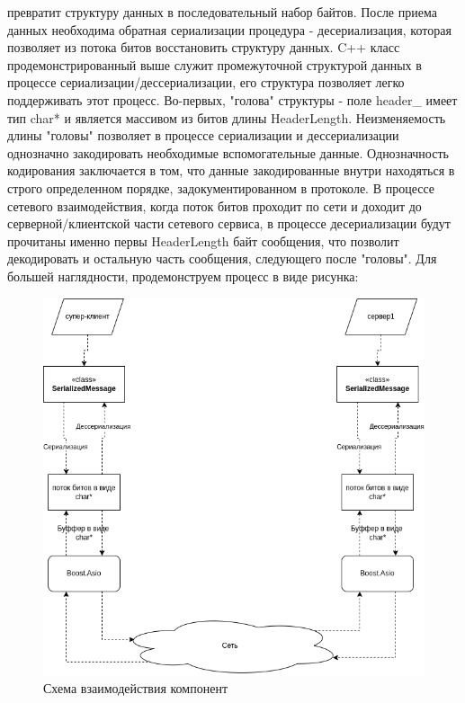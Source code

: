 \documentclass[a4paper, 14pt]{extreport}
\begin{document}
превратит структуру данных в последовательный набор байтов. После приема данных необходима обратная сериализации процедура - десериализация,
которая позволяет из потока битов восстановить структуру данных. C++ класс продемонстрированный выше служит промежуточной структурой данных 
в процессе сериализации/дессериализации, его структура позволяет легко поддерживать этот процесс. Во-первых, "голова" структуры - поле 
header\_ имеет тип char* и является массивом из битов длины HeaderLength. Неизменяемость длины "головы" позволяет в процессе сериализации 
и дессериализации однозначно закодировать необходимые вспомогательные данные. Однозначность кодирования заключается в том, что данные 
закодированные внутри находяться в строго определенном порядке, задокументированном в протоколе. В процессе сетевого взаимодействия,
когда поток битов проходит по сети и доходит до серверной/клиентской части сетевого сервиса, в процессе десериализации будут прочитаны 
именно первы HeaderLength байт сообщения, что позволит декодировать и остальную часть сообщения, следующего после "головы". Для большей
наглядности, продемонструем процесс в виде рисунка:
\newpage
\begin{figure}[ht]
\begin{center}
\includegraphics[scale = 0.5]{./figure/base_networking}
\caption{Схема взаимодействия компонент}
\label{fig:manip_photo}
\end{center}
\end{figure}
\end{document}

